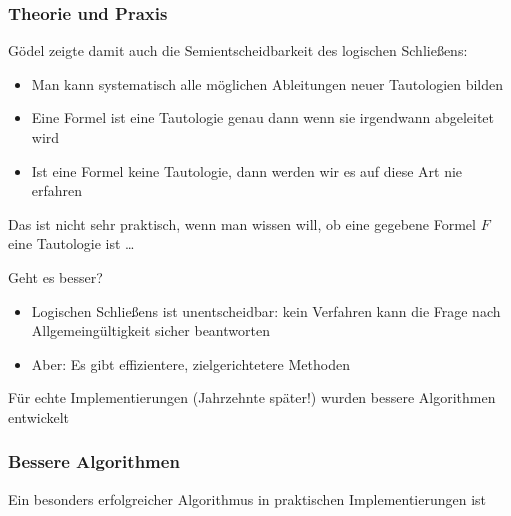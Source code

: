 \documentclass[aspectratio=1610,onlymath]{beamer}
\begin{document}
\begin{frame}\frametitle{Theorie und Praxis}

Gödel zeigte damit auch die Semientscheidbarkeit des logischen Schließens:
\begin{itemize}
\item Man kann systematisch alle möglichen Ableitungen neuer Tautologien
bilden
\item Eine Formel ist eine Tautologie genau dann wenn sie irgendwann abgeleitet wird
\item Ist eine Formel keine Tautologie, dann werden wir es auf diese Art nie erfahren
\end{itemize}\pause

Das ist nicht sehr praktisch, wenn man wissen will, ob eine gegebene Formel $F$ eine
Tautologie ist \ldots
\bigskip

\alert{Geht es besser?}\pause
\begin{itemize}
\item Logischen Schließens ist unentscheidbar: kein Verfahren kann die Frage nach Allgemeingültigkeit sicher beantworten
\item Aber: Es gibt effizientere, zielgerichtetere Methoden
\end{itemize}

Für echte Implementierungen (Jahrzehnte später!) wurden bessere Algorithmen entwickelt

\end{frame}

\begin{frame}\frametitle{Bessere Algorithmen}\pause

Ein besonders erfolgreicher Algorithmus in praktischen Implementierungen ist
\bigskip\pause


\end{frame}
\end{document}

